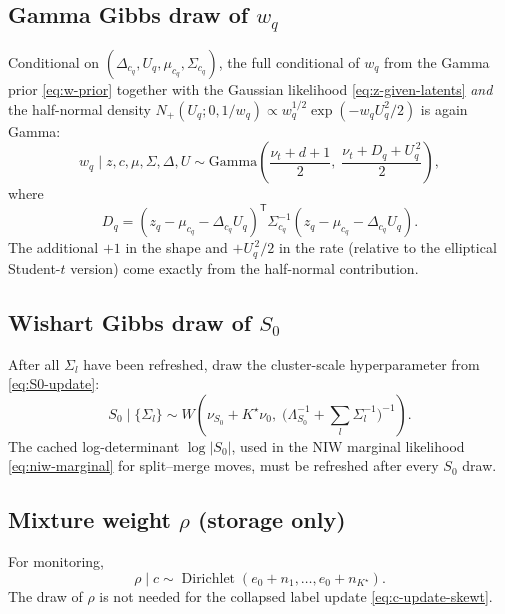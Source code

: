 \documentclass[11pt]{article}
\newcommand{\trans}{^{\mathsf T}}
\DeclareMathOperator{\Dir}{Dirichlet}
\begin{document}
\subsection{Gamma Gibbs draw of $w_q$}

Conditional on $(\Delta_{c_q},U_q,\mu_{c_q},\Sigma_{c_q})$, the full
conditional of $w_q$ from the Gamma prior \eqref{eq:w-prior} together with
the Gaussian likelihood \eqref{eq:z-given-latents} \emph{and} the
half-normal density $N_+(U_q;0,1/w_q)\propto w_q^{1/2}\exp(-w_q U_q^2/2)$
is again Gamma:
\begin{equation}
    w_q\mid z,c,\mu,\Sigma,\Delta,U
    \sim
    \mathrm{Gamma}\!\left(
    \frac{\nu_t+d+1}{2},\;
    \frac{\nu_t+D_q+U_q^{\,2}}{2}
    \right),
    \label{eq:w-post}
\end{equation}
where
\begin{equation}
    D_q
    =
    (z_q-\mu_{c_q}-\Delta_{c_q}U_q)\trans
    \Sigma_{c_q}^{-1}
    (z_q-\mu_{c_q}-\Delta_{c_q}U_q).
    \label{eq:Dq}
\end{equation}
The additional $+1$ in the shape and $+U_q^{\,2}/2$ in the rate (relative
to the elliptical Student-$t$ version) come exactly from the half-normal
contribution.

\subsection{Wishart Gibbs draw of $S_0$}

After all $\Sigma_l$ have been refreshed, draw the cluster-scale
hyperparameter from \eqref{eq:S0-update}:
\begin{equation}
    S_0\mid\{\Sigma_l\}
    \sim
    W\!\left(
    \nu_{S_0}+K^\star\nu_0,\;
    \bigl(\Lambda_{S_0}^{-1}+\textstyle\sum_l\Sigma_l^{-1}\bigr)^{-1}
    \right).
    \label{eq:S0-gibbs}
\end{equation}
The cached log-determinant $\log|S_0|$, used in the NIW marginal likelihood
\eqref{eq:niw-marginal} for split--merge moves, must be refreshed after
every $S_0$ draw.

\subsection{Mixture weight $\rho$ (storage only)}

For monitoring,
\begin{equation}
    \rho\mid c
    \sim
    \Dir(e_0+n_1,\dots,e_0+n_{K^\star}).
    \label{eq:rho-post}
\end{equation}
The draw of $\rho$ is not needed for the collapsed label update
\eqref{eq:c-update-skewt}.
\end{document}

